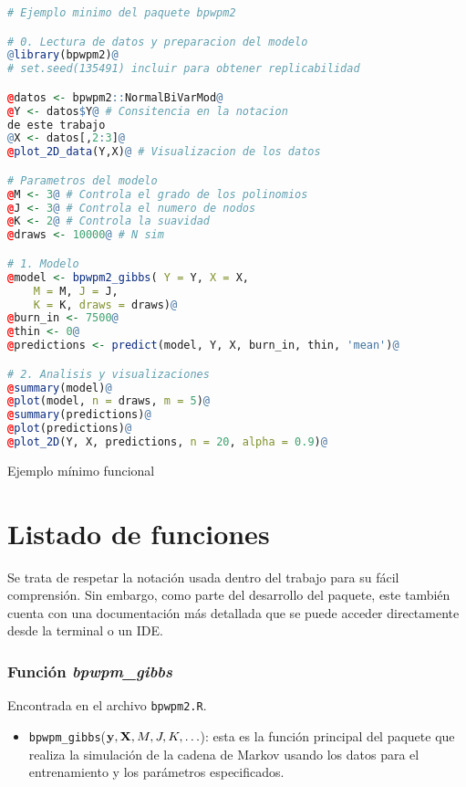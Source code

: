 \documentclass[../../Main/Main.tex]{subfiles}
\begin{document}
\begin{table}[p]
\makebox[\linewidth]{\rule{\textwidth}{0.4pt}}
\begin{lstlisting}[language = R, style = base]
	# Ejemplo minimo del paquete bpwpm2

# 0. Lectura de datos y preparacion del modelo  
@library(bpwpm2)@
# set.seed(135491) incluir para obtener replicabilidad

@datos <- bpwpm2::NormalBiVarMod@
@Y <- datos$Y@ # Consitencia en la notacion 
de este trabajo
@X <- datos[,2:3]@
@plot_2D_data(Y,X)@ # Visualizacion de los datos

# Parametros del modelo
@M <- 3@ # Controla el grado de los polinomios 
@J <- 3@ # Controla el numero de nodos
@K <- 2@ # Controla la suavidad
@draws <- 10000@ # N sim

# 1. Modelo
@model <- bpwpm2_gibbs(	Y = Y, X = X, 
	M = M, J = J, 
	K = K, draws = draws)@
@burn_in <- 7500@
@thin <- 0@
@predictions <- predict(model, Y, X, burn_in, thin, 'mean')@

# 2. Analisis y visualizaciones
@summary(model)@
@plot(model, n = draws, m = 5)@
@summary(predictions)@
@plot(predictions)@
@plot_2D(Y, X, predictions, n = 20, alpha = 0.9)@
\end{lstlisting}
\makebox[\linewidth]{\rule{\textwidth}{0.4pt}}
\caption{Ejemplo mínimo funcional}
\label{tab:Codigo}
\end{table}

\section{Listado de funciones}
Se trata de respetar la notación usada dentro del trabajo para su fácil comprensión. Sin embargo, como parte del desarrollo del paquete, este también cuenta con una documentación más detallada que se puede acceder directamente desde la terminal o un IDE.

\subsubsection*{Función \textit{bpwpm\_gibbs}}
Encontrada en el archivo \verb|bpwpm2.R|.
\begin{itemize}[label={}]
	\item \verb|bpwpm_gibbs|($\mathbf{y},\mathbf{X},M,J,K,\ldots$): esta es la función principal del paquete que realiza la simulación de la cadena de Markov usando los datos para el entrenamiento y los parámetros especificados.
\end{itemize}
\end{document}
